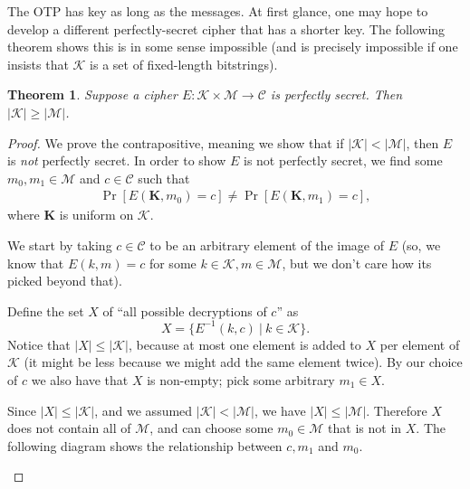 \documentclass[11pt]{article}
\newtheorem{theorem}{Theorem}
\newcommand{\msgs}{\mathcal{M}}
\newcommand{\ctxts}{\mathcal{C}}
\newcommand{\keys}{\mathcal{K}}
\newcommand{\enc}{E}
\newcommand{\bK}{\mathbf{K}}
\begin{document}
The OTP has key as long as the messages. At first glance, one may hope to
develop a different perfectly-secret cipher that has a shorter key.  The
following theorem shows this is in some sense impossible (and is precisely
impossible if one insists that $\keys$ is a set of fixed-length bitstrings).
\begin{theorem}
    Suppose a cipher $\enc : \keys\times\msgs \to \ctxts$ is perfectly secret.
    Then $|\keys| \geq |\msgs|$.
\end{theorem}
\begin{proof}
    We prove the contrapositive, meaning we show that if $|\keys| < |\msgs|$,
    then $E$ is \emph{not} perfectly secret. In order to show $E$ is not
    perfectly secret, we find some $m_0,m_1\in\msgs$ and $c\in\ctxts$ such that
    \begin{align}\label{neqprob}
        \Pr[\enc(\bK,m_0) = c] \neq \Pr[\enc(\bK,m_1) = c],
    \end{align}
    where $\bK$ is uniform on $\keys$.

    We start by taking $c\in\ctxts$ to be an arbitrary element of the image of
    $E$ (so, we know that $E(k,m)=c$ for some $k\in\keys,m\in\msgs$, but we
    don't care how its picked beyond that).

    Define the set $X$ of ``all possible decryptions of $c$'' as
    \[
        X = \{E^{-1}(k,c) \ | \ k\in\keys \}.
    \]
    Notice that $|X| \leq |\keys|$, because at most one element is added to $X$
    per element of $\keys$ (it might be less because we might add the same
    element twice). By our choice of $c$ we also have that $X$ is non-empty;
    pick some arbitrary $m_1\in X$.

    Since $|X| \leq |\keys|$, and we assumed $|\keys| < |\msgs|$, we have
    $|X| \leq |\msgs|$. Therefore $X$ does not contain all of $\msgs$, and
    can choose some $m_0 \in \msgs$ that is not in $X$.
    The following diagram shows the relationship between $c,m_1$ and $m_0$.
    \begin{center}
\end{center}
\end{proof}
\end{document}

